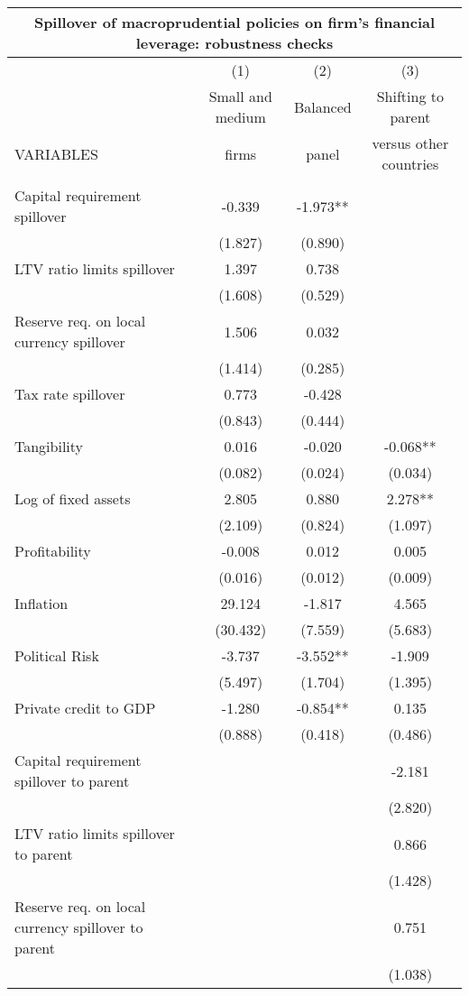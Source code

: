 \begin{tabular}{lccc}
\multicolumn{4}{c}{Spillover of macroprudential policies on firm's financial leverage: robustness checks} \\ \hline
 & (1) & (2) & (3) \\
 & Small and medium & Balanced & Shifting to parent \\
VARIABLES & firms & panel & versus other countries \\ \hline
 &  &  &  \\
Capital requirement spillover & -0.339 & -1.973** &  \\
 & (1.827) & (0.890) &  \\
LTV ratio limits spillover & 1.397 & 0.738 &  \\
 & (1.608) & (0.529) &  \\
Reserve req. on local currency spillover & 1.506 & 0.032 &  \\
 & (1.414) & (0.285) &  \\
Tax rate spillover & 0.773 & -0.428 &  \\
 & (0.843) & (0.444) &  \\
Tangibility & 0.016 & -0.020 & -0.068** \\
 & (0.082) & (0.024) & (0.034) \\
Log of fixed assets & 2.805 & 0.880 & 2.278** \\
 & (2.109) & (0.824) & (1.097) \\
Profitability & -0.008 & 0.012 & 0.005 \\
 & (0.016) & (0.012) & (0.009) \\
Inflation & 29.124 & -1.817 & 4.565 \\
 & (30.432) & (7.559) & (5.683) \\
Political Risk & -3.737 & -3.552** & -1.909 \\
 & (5.497) & (1.704) & (1.395) \\
Private credit to GDP & -1.280 & -0.854** & 0.135 \\
 & (0.888) & (0.418) & (0.486) \\
Capital requirement spillover to parent &  &  & -2.181 \\
 &  &  & (2.820) \\
LTV ratio limits spillover to parent &  &  & 0.866 \\
 &  &  & (1.428) \\
Reserve req. on local currency spillover to parent &  &  & 0.751 \\
 &  &  & (1.038) \\

\end{tabular}
